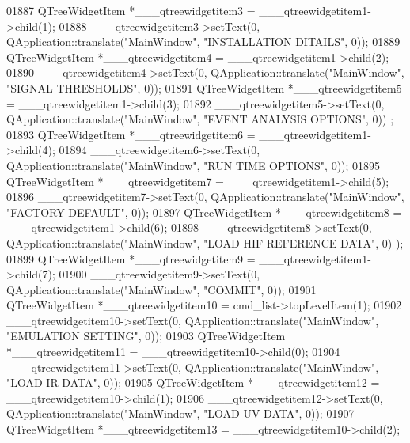 \begin{DoxyCode}
01887         QTreeWidgetItem *\_\_\_qtreewidgetitem3 = \_\_\_qtreewidgetitem1->child(1);
01888         \_\_\_qtreewidgetitem3->setText(0, QApplication::translate(\textcolor{stringliteral}{"MainWindow"}, \textcolor{stringliteral}{"INSTALLATION DITAILS"}, 0));
01889         QTreeWidgetItem *\_\_\_qtreewidgetitem4 = \_\_\_qtreewidgetitem1->child(2);
01890         \_\_\_qtreewidgetitem4->setText(0, QApplication::translate(\textcolor{stringliteral}{"MainWindow"}, \textcolor{stringliteral}{"SIGNAL THRESHOLDS"}, 0));
01891         QTreeWidgetItem *\_\_\_qtreewidgetitem5 = \_\_\_qtreewidgetitem1->child(3);
01892         \_\_\_qtreewidgetitem5->setText(0, QApplication::translate(\textcolor{stringliteral}{"MainWindow"}, \textcolor{stringliteral}{"EVENT ANALYSIS OPTIONS"}, 0))
      ;
01893         QTreeWidgetItem *\_\_\_qtreewidgetitem6 = \_\_\_qtreewidgetitem1->child(4);
01894         \_\_\_qtreewidgetitem6->setText(0, QApplication::translate(\textcolor{stringliteral}{"MainWindow"}, \textcolor{stringliteral}{"RUN TIME OPTIONS"}, 0));
01895         QTreeWidgetItem *\_\_\_qtreewidgetitem7 = \_\_\_qtreewidgetitem1->child(5);
01896         \_\_\_qtreewidgetitem7->setText(0, QApplication::translate(\textcolor{stringliteral}{"MainWindow"}, \textcolor{stringliteral}{"FACTORY DEFAULT"}, 0));
01897         QTreeWidgetItem *\_\_\_qtreewidgetitem8 = \_\_\_qtreewidgetitem1->child(6);
01898         \_\_\_qtreewidgetitem8->setText(0, QApplication::translate(\textcolor{stringliteral}{"MainWindow"}, \textcolor{stringliteral}{"LOAD HIF REFERENCE DATA"}, 0)
      );
01899         QTreeWidgetItem *\_\_\_qtreewidgetitem9 = \_\_\_qtreewidgetitem1->child(7);
01900         \_\_\_qtreewidgetitem9->setText(0, QApplication::translate(\textcolor{stringliteral}{"MainWindow"}, \textcolor{stringliteral}{"COMMIT"}, 0));
01901         QTreeWidgetItem *\_\_\_qtreewidgetitem10 = cmd\_list->topLevelItem(1);
01902         \_\_\_qtreewidgetitem10->setText(0, QApplication::translate(\textcolor{stringliteral}{"MainWindow"}, \textcolor{stringliteral}{"EMULATION SETTING"}, 0));
01903         QTreeWidgetItem *\_\_\_qtreewidgetitem11 = \_\_\_qtreewidgetitem10->child(0);
01904         \_\_\_qtreewidgetitem11->setText(0, QApplication::translate(\textcolor{stringliteral}{"MainWindow"}, \textcolor{stringliteral}{"LOAD IR DATA"}, 0));
01905         QTreeWidgetItem *\_\_\_qtreewidgetitem12 = \_\_\_qtreewidgetitem10->child(1);
01906         \_\_\_qtreewidgetitem12->setText(0, QApplication::translate(\textcolor{stringliteral}{"MainWindow"}, \textcolor{stringliteral}{"LOAD UV DATA"}, 0));
01907         QTreeWidgetItem *\_\_\_qtreewidgetitem13 = \_\_\_qtreewidgetitem10->child(2);

\end{DoxyCode}

